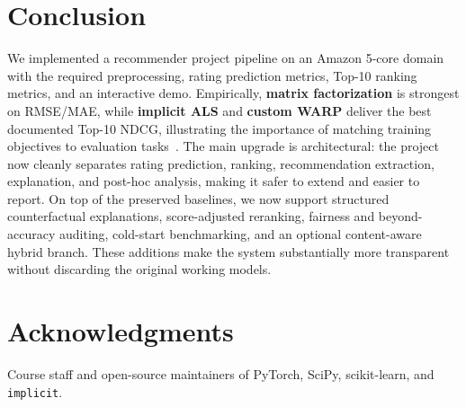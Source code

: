 \documentclass[sigconf,nonacm]{acmart}
\begin{document}
\section{Conclusion}
We implemented a recommender project pipeline on an Amazon 5-core domain with the required preprocessing, rating prediction metrics, Top-10 ranking metrics, and an interactive demo. Empirically, \textbf{matrix factorization} is strongest on RMSE/MAE, while \textbf{implicit ALS} and \textbf{custom WARP} deliver the best documented Top-10 NDCG, illustrating the importance of matching training objectives to evaluation tasks~\cite{cremonesi2010,hu2008collaborative}. The main upgrade is architectural: the project now cleanly separates rating prediction, ranking, recommendation extraction, explanation, and post-hoc analysis, making it safer to extend and easier to report. On top of the preserved baselines, we now support structured counterfactual explanations, score-adjusted reranking, fairness and beyond-accuracy auditing, cold-start benchmarking, and an optional content-aware hybrid branch. These additions make the system substantially more transparent without discarding the original working models.

\section*{Acknowledgments}
Course staff and open-source maintainers of PyTorch, SciPy, scikit-learn, and \texttt{implicit}.
\end{document}
